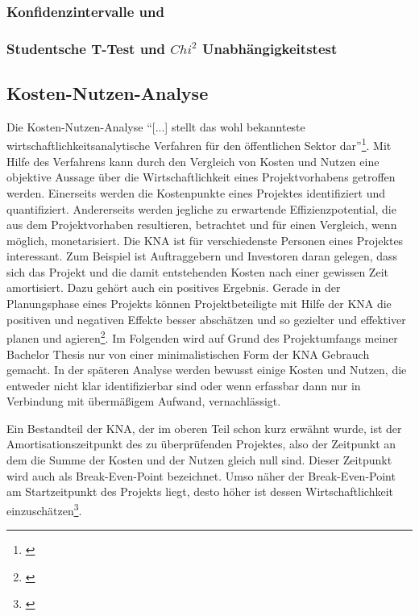 
\subsubsection{Konfidenzintervalle und }


\subsubsection{Studentsche T-Test und $Chi^2$ Unabhängigkeitstest}



\subsection{Kosten-Nutzen-Analyse}
Die Kosten-Nutzen-Analyse \enquote{[...] stellt das wohl bekannteste wirtschaftlichkeitsanalytische Verfahren für den öffentlichen Sektor dar}\footnote{\cite[vgl.][1]{Hanusch2011}}. Mit Hilfe des Verfahrens kann durch den Vergleich von Kosten und Nutzen eine objektive Aussage über die Wirtschaftlichkeit eines Projektvorhabens getroffen werden. Einerseits werden die Kostenpunkte eines Projektes identifiziert und quantifiziert. Andererseits werden jegliche zu erwartende Effizienzpotential, die aus dem Projektvorhaben resultieren, betrachtet und für einen Vergleich, wenn möglich, monetarisiert. Die \gls{KNA} ist für verschiedenste Personen eines Projektes interessant. Zum Beispiel ist Auftraggebern und Investoren daran gelegen, dass sich das Projekt und die damit entstehenden Kosten nach einer gewissen Zeit amortisiert. Dazu gehört auch ein positives Ergebnis. Gerade in der Planungsphase eines Projekts können Projektbeteiligte mit Hilfe der \gls{KNA} die positiven und negativen Effekte besser abschätzen und so gezielter und effektiver planen und agieren\footnote{\cite[vgl.][]{Hanusch2011}}. Im Folgenden wird auf Grund des Projektumfangs meiner Bachelor Thesis nur von einer minimalistischen Form der \gls{KNA} Gebrauch gemacht. In der späteren Analyse werden bewusst einige Kosten und Nutzen, die entweder nicht klar identifizierbar sind oder wenn erfassbar dann nur in Verbindung mit übermäßigem Aufwand, vernachlässigt. 

Ein Bestandteil der \gls{KNA}, der im oberen Teil schon kurz erwähnt wurde, ist der Amortisationszeitpunkt des zu überprüfenden Projektes, also der Zeitpunkt an dem die Summe der Kosten und der Nutzen gleich null sind. Dieser Zeitpunkt wird auch als Break-Even-Point bezeichnet. Umso näher der Break-Even-Point am Startzeitpunkt des Projekts liegt, desto höher ist dessen Wirtschaftlichkeit einzuschätzen\footnote{\cite[vgl.][]{Hanusch2011}}.

